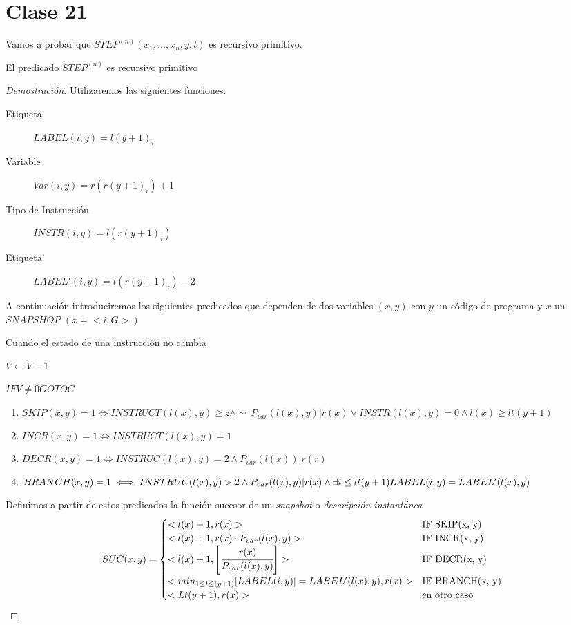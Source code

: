 \section{Clase 21}
 
Vamos a probar que $STEP^{(n)}(x_1, \ldots, x_n, y, t)$ es recursivo primitivo.
 
 
\begin{theorem}
El predicado $STEP^{(n)}$ es recursivo primitivo
\end{theorem}
 
\begin{proof}[Demostraci\'on]
Utilizaremos las siguientes funciones:
 
\begin{description}
	\item [Etiqueta] $LABEL(i, y) = {l(y + 1)}_{i}$
	\item [Variable] $Var(i, y) = r({r(y + 1)}_{i}) + 1$
	\item [Tipo de Instrucci\'on] $INSTR(i, y) = l({r(y + 1)}_{i})$
	\item [Etiqueta'] $LABEL'(i, y) = l({r(y + 1)}_{i}) - 2$
\end{description}
 
A continuaci\'on introduciremos los siguientes predicados que dependen de dos variables $(x, y)$ con $y$ un c\'odigo de programa y $x$ un $SNAPSHOP$ $(x = <i, G>)$
 
Cuando el estado de una instrucci\'on no cambia
 
$V \leftarrow V - 1$
 
$IF V \neq 0 GOTO C$
 
 
\begin{enumerate}
	\item $SKIP(x, y) = 1 \iff INSTRUCT(l(x), y) \geq z \wedge \sim\ P_{var}(l(x), y) | r(x) \lor INSTR(l(x), y) = 0 \wedge l(x) \geq lt(y + 1)$
	\item $INCR(x, y) = 1 \iff INSTRUCT(l(x), y) = 1$
	\item $DECR (x, y) = 1 \iff INSTRUC(l(x), y) = 2 \wedge P_{var}(l(x)) | r(r)$	
	\item $BRANCH(x, y) = 1 \iff INSTRUC(l(x), y) > 2 \wedge P_{var}(l(x), y) | r(x) \\ \wedge \exists i 						\leq lt(y + 1) LABEL(i, y) = LABEL'(l(x), y)$
\end{enumerate}
 
Definimos a partir de estos predicados la funci\'on sucesor de un \textit{snapshot} o \textit{descripci\'on instant\'anea}
\[
SUC(x, y) =
\begin{cases}
<l(x) + 1, r(x)>													&\text{IF SKIP(x, y)}		\\
<l(x) + 1, r(x) \cdot P_{var}(l(x), y)>								&\text{IF INCR(x, y)}		\\
<l(x) + 1, \left[\cfrac{r(x)}{P_{var}(l(x), y)} \right]>			&\text{IF DECR(x, y)}		\\
<min_{1 \leq t \leq (y + 1)} [LABEL(i, y)] = LABEL'(l(x), y), r(x)>	&\text{IF BRANCH(x, y)}		\\
<Lt(y+ 1), r(x)>													&\text{en otro caso}		\\
\end{cases}
\]
 

\end{proof}
